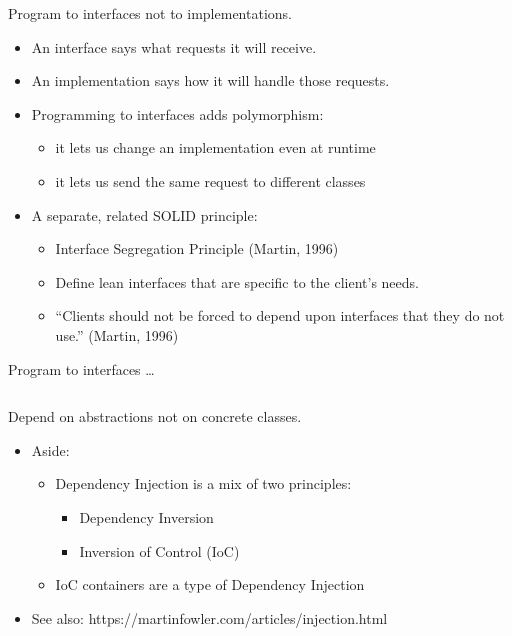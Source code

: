 \documentclass{beamer}
\begin{document}
\begin{frame}{Program to interfaces not to implementations.}
    \begin{itemize}
        \item An interface says what requests it will receive.
        \item An implementation says how it will handle those requests.
        \item Programming to interfaces adds polymorphism:
            \begin{itemize}
                \item it lets us change an implementation even at runtime
                \item it lets us send the same request to different classes
            \end{itemize}
        \item A separate, related SOLID principle:
            \begin{itemize}
                \item Interface Segregation Principle (Martin, 1996)
                \item Define lean interfaces that are specific to the client's needs.
                \item ``Clients should not be forced to depend upon interfaces that they do not use.'' (Martin, 1996)
            \end{itemize}
    \end{itemize}
\end{frame}

\begin{frame}{Program to interfaces \ldots}
    \begin{columns}
        \column{\dimexpr\paperwidth-40pt}
        
    \end{columns}
\end{frame}

\begin{frame}{Depend on abstractions not on concrete classes.}
    \begin{itemize}
    \item Aside:
        \begin{itemize}
            \item Dependency Injection is a mix of two principles:
                \begin{itemize}
                    \item Dependency Inversion
                    \item Inversion of Control (IoC)
                \end{itemize}
            \item IoC containers are a type of Dependency Injection
        \end{itemize}
        \item See also: https://martinfowler.com/articles/injection.html
    \end{itemize}
\end{frame}
\end{document}
